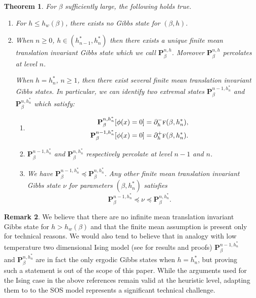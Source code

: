 \documentclass[10pt]{amsart}
\newenvironment{enumeratei}
{\bgroup\def\theenumi{\roman{enumi}}\def\theenumii{\Alph{enumii}}\begin{enumerate}}
{\end{enumerate}\egroup}
\numberwithin{equation}{section}
\theoremstyle{plain}
\newtheorem{theorem}{Theorem}[section]
\theoremstyle{definition}
\newtheorem{rem}[theorem]{Remark}
\newcommand{\bP}{{\ensuremath{\mathbf P}} }
\newcommand{\gb}{\beta}
\newcommand{\tf}{\textsc{f}}
\begin{document}
\begin{theorem}\label{Gibbs}
For $\gb$ sufficiently large, the following holds true.
\begin{enumeratei}
\item
For $h\le h_w(\gb)$, there exists no Gibbs state for $(\gb,h)$.
\item
When $n\ge 0$, $h\in (h^*_{n-1},h^*_{n})$ then there exists a unique finite mean translation invariant Gibbs state
which we call $\bP^{n,h}_{\gb}$.
Moreover $\bP^{n,h}_{\gb}$ percolates at level $n$.

When $h=h^*_n$, $n\ge 1$, then there exist several finite mean translation invariant Gibbs states.
In particular, we can identify two extremal states $\bP^{n-1,h^*_n}_{\gb}$ and $\bP^{n,h^*_n}_{\gb}$ which satisfy:
\begin{enumeratei}
\item\mbox{}\vspace*{-10pt}
\begin{equation}\label{variousgibbs}
\begin{split}
\bP^{n,h^*_n}_{\gb}[\phi(x)=0]&= \partial^-_h\tf(\gb,h^*_n), \\
\bP^{n-1,h^*_n}_{\gb}[\phi(x)=0]&= \partial^+_h\tf(\gb,h^*_n).
\end{split}
\end{equation}
\item
$\bP^{n-1,h^*_n}_{\gb}$ and $\bP^{n,h^*_n}_{\gb}$ respectively percolate at level $n-1$ and $n$.
\item
We have $\bP^{n-1,h^*_n}_{\gb}\preccurlyeq \bP^{n,h^*_n}_{\gb}$. Any other finite mean translation invariant Gibbs state $\nu$
for parameters $(\gb,h^*_n)$ satisfies
\begin{equation}\label{ssanduba}
\bP^{n-1,h^*_n}_{\gb}\preccurlyeq \nu \preccurlyeq \bP^{n,h^*_n}_{\gb}.
\end{equation}
\end{enumeratei}
\end{enumeratei}
\end{theorem}

\begin{rem}
We believe that there are no infinite mean translation invariant Gibbs state for $h>h_w(\gb)$ and that the finite mean assumption is present only for technical reasons.
We would also tend to believe that in analogy with low temperature two dimensional Ising model (see \cite{cf:A, cf:CoV, cf:H} for results and proofs)
$\bP^{n-1,h^*_n}_{\gb}$ and $\bP^{n,h^*_n}_{\gb}$ are in fact the only
ergodic Gibbs states when $h=h^*_n$, but proving such a statement is out of the scope of this paper. While the arguments used for the Ising case in the above references remain valid at the heuristic level, adapting them to to the SOS model represents a significant technical challenge.
\end{rem}
\end{document}
